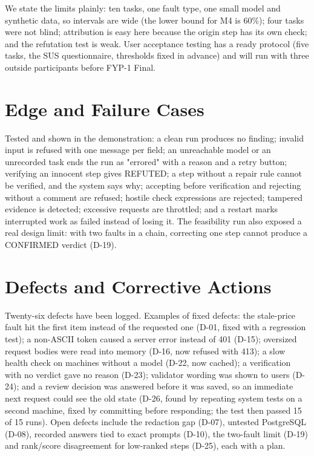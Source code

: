 We state the limits plainly: ten tasks, one fault type, one small model and synthetic data, so intervals are wide (the lower bound for M4 is 60\%); four tasks were not blind; attribution is easy here because the origin step has its own check; and the refutation test is weak. User acceptance testing has a ready protocol (five tasks, the SUS questionnaire, thresholds fixed in advance) and will run with three outside participants before FYP-1 Final.

\section{Edge and Failure Cases}

Tested and shown in the demonstration: a clean run produces no finding; invalid input is refused with one message per field; an unreachable model or an unrecorded task ends the run as "errored" with a reason and a retry button; verifying an innocent step gives REFUTED; a step without a repair rule cannot be verified, and the system says why; accepting before verification and rejecting without a comment are refused; hostile check expressions are rejected; tampered evidence is detected; excessive requests are throttled; and a restart marks interrupted work as failed instead of losing it. The feasibility run also exposed a real design limit: with two faults in a chain, correcting one step cannot produce a CONFIRMED verdict (D-19).

\section{Defects and Corrective Actions}

Twenty-six defects have been logged. Examples of fixed defects: the stale-price fault hit the first item instead of the requested one (D-01, fixed with a regression test); a non-ASCII token caused a server error instead of 401 (D-15); oversized request bodies were read into memory (D-16, now refused with 413); a slow health check on machines without a model (D-22, now cached); a verification with no verdict gave no reason (D-23); validator wording was shown to users (D-24); and a review decision was answered before it was saved, so an immediate next request could see the old state (D-26, found by repeating system tests on a second machine, fixed by committing before responding; the test then passed 15 of 15 runs). Open defects include the redaction gap (D-07), untested PostgreSQL (D-08), recorded answers tied to exact prompts (D-10), the two-fault limit (D-19) and rank/score disagreement for low-ranked steps (D-25), each with a plan.

